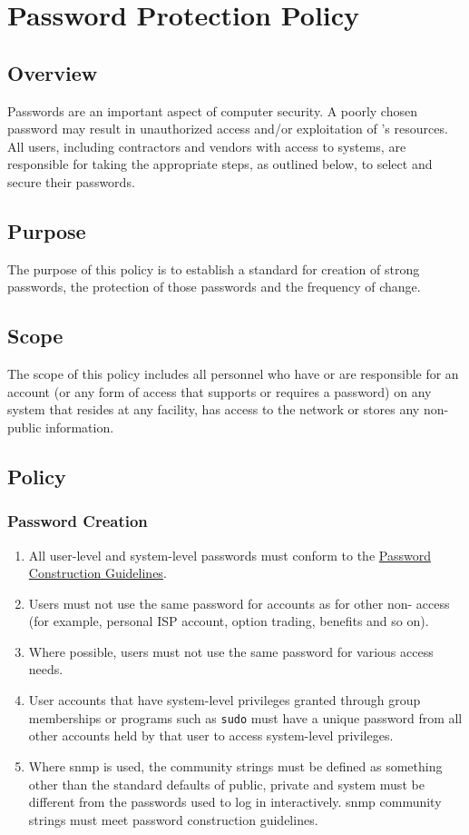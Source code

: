 \chapter{Password Protection Policy}\label{G:PPP}
\CommonIntroduction
\section{Overview}
Passwords are an important aspect of computer security.  
A poorly chosen password may result in unauthorized access and/or exploitation of \CompanyName{}'s resources.  
All users, including contractors and vendors with access to \CompanyName{} systems, are responsible for taking the appropriate steps, as outlined below, to select and secure their passwords.
\section{Purpose}
The purpose of this policy is to establish a standard for creation of strong passwords, the protection of those passwords\oxford{} and the frequency of change.
\section{Scope}
The scope of this policy includes all personnel who have or are responsible for an account (or any form of access that supports or requires a password) on any system that resides at any \CompanyName{} facility, has access to the \CompanyName{} network\oxford{} or stores any non-public \CompanyName{} information.
\section{Policy}
\subsection{Password Creation}
\begin{enumerate}
\item
All user-level and system-level passwords must conform to the \hyperref[G:PCG]{Password Construction Guidelines}.
\item
Users must not use the same password for \CompanyName{} accounts as for other non-\CompanyName{} access (for example, personal ISP account, option trading, benefits\oxford{} and so on).
\item
Where possible, users must not use the same password for various \CompanyName{} access needs.
\item
User accounts that have system-level privileges granted through group memberships or programs such as \texttt{sudo} must have a unique password from all other accounts held by that user to access system-level privileges.
\item
Where \gls{snmp} is used, the community strings must be defined as something other than the standard defaults of public, private\oxford{} and system  must be different from the passwords used to log in interactively.  
\gls{snmp} community strings must meet password construction guidelines.
\end{enumerate}

